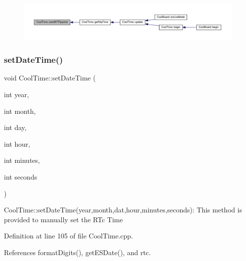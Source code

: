 \nopagebreak
\begin{figure}[H]
\begin{center}
\leavevmode
\includegraphics[width=350pt]{classCoolTime_a236a38d120dc53bc67456d763838c5a1_icgraph}
\end{center}
\end{figure}
\mbox{\label{classCoolTime_ab81ea7fdaace111aa01cc1ec84c6d297}} 
\subsubsection{\texorpdfstring{set\+Date\+Time()}{setDateTime()}}
{\footnotesize\ttfamily void Cool\+Time\+::set\+Date\+Time (\begin{DoxyParamCaption}\item[{int}]{year,  }\item[{int}]{month,  }\item[{int}]{day,  }\item[{int}]{hour,  }\item[{int}]{minutes,  }\item[{int}]{seconds }\end{DoxyParamCaption})}

Cool\+Time\+::set\+Date\+Time(year,month,dat,hour,minutes,seconds)\+: This method is provided to manually set the R\+Tc Time 

Definition at line 105 of file Cool\+Time.\+cpp.



References format\+Digits(), get\+E\+S\+Date(), and rtc.


